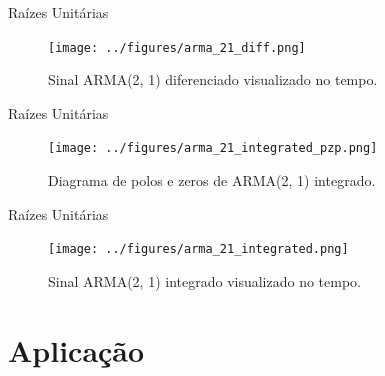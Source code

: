 \documentclass [xcolor=svgnames, t] {beamer}
\begin{document}
\begin{frame}{Raízes Unitárias}


\begin{figure}[H]
    \centering
    \texttt{[image: ../figures/arma\_21\_diff.png]}
    \caption{Sinal ARMA(2, 1) diferenciado visualizado no tempo.}
\end{figure}


\end{frame}

\begin{frame}{Raízes Unitárias}


\begin{figure}[H]
    \centering
    \texttt{[image: ../figures/arma\_21\_integrated\_pzp.png]}
    \caption{Diagrama de polos e zeros de ARMA(2, 1) integrado.}
\end{figure}


\end{frame}

\begin{frame}{Raízes Unitárias}


\begin{figure}[H]
    \centering
    \texttt{[image: ../figures/arma\_21\_integrated.png]}
    \caption{Sinal ARMA(2, 1) integrado visualizado no tempo.}
\end{figure}


\end{frame}

\section{Aplicação}
\end{document}
